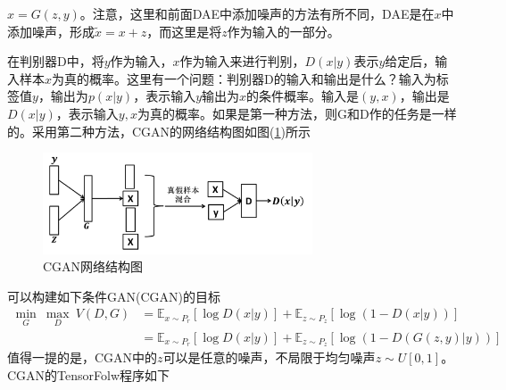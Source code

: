         $x = G(z,y)$。注意，这里和前面DAE中添加噪声的方法有所不同，DAE是在$x$中添加噪声，形成$\tilde{x} = x+z$，而这里是将$z$作为输入的一部分。
        \par
        在判别器D中，将$y$作为输入，$x$作为输入来进行判别，$D(x|y)$表示$y$给定后，输入样本$x$为真的概率。这里有一个问题：判别器D的输入和输出是什么？输入为标签值$y$，输出为$p(x|y)$，表示输入$y$输出为$x$的条件概率。输入是$(y,x)$，输出是$D(x|y)$，表示输入$y,x$为真的概率。如果是第一种方法，则G和D作的任务是一样的。采用第二种方法，CGAN的网络结构图如图(\ref{fig:CGAN网络结构图})所示
                \begin{figure}[H]
                \centering
                \includegraphics[width=8cm]{images/CGAN_network.jpg}
                \caption{CGAN网络结构图}
                \label{fig:CGAN网络结构图}
                \end{figure}
        可以构建如下条件GAN(CGAN)的目标
        \begin{align*}
        \min_G\ \max_D\ V(D,G) & = \mathbb{E}_{x\sim P_r}[\log D(x|y)] + \mathbb{E}_{z\sim P_z}[\log (1-D(x|y))]\\
        & = \mathbb{E}_{x\sim P_r}[\log D(x|y)] + \mathbb{E}_{z\sim P_z}[\log (1-D(G(z,y)|y))]
        \end{align*}
        值得一提的是，CGAN中的$z$可以是任意的噪声，不局限于均匀噪声$z\sim U[0,1]$。CGAN的TensorFolw程序如下
